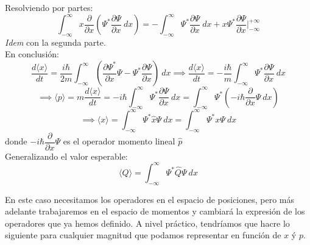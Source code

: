 \documentclass{report}
\begin{document}
    \noindent Resolviendo por partes:\\ 
    \[\int_{-\infty}^{\infty}x\dfrac{\partial}{\partial x}\left(\Psi^*\dfrac{\partial\Psi}{\partial x}\ dx\right)=
    -\int_{-\infty}^{\infty}\Psi^*\dfrac{\partial\Psi}{\partial x}\ dx+x\Psi^*\dfrac{\partial\Psi}{\partial x}\Big|_{-\infty}^{+\infty}\]
    \noindent \textit{Idem} con la segunda parte.\\

\clearpage
    \noindent En conclusión:
    \begin{equation}
      \dfrac{d\langle x\rangle}{dt}=\dfrac{i\hbar}{2m}\int_{-\infty}^{\infty}\left(\dfrac{\partial\Psi^*}{\partial x}\Psi-\Psi^*\dfrac{\partial\Psi}{\partial x}\right)\ dx \implies
      \boxed{\dfrac{d\langle x\rangle}{dt}=-\dfrac{i\hbar}{m}\int_{-\infty}^{\infty}\Psi^*\dfrac{\partial\Psi}{\partial x}\ dx}
    \end{equation}
    \[\implies \langle p\rangle=m\dfrac{d\langle x\rangle}{dt}=-i\hbar\int_{-\infty}^{\infty}\Psi^*\dfrac{\partial\Psi}{\partial x}\ dx=
    \int_{-\infty}^{\infty}\Psi^*\left(-i\hbar\dfrac{\partial}{\partial x}\Psi\ dx\right)\] 
    \[\implies \langle x\rangle=\int_{-\infty}^{\infty}\Psi^*\hat{x}\Psi\ dx=\int_{-\infty}^{\infty}\Psi^* x\Psi\ dx\]
    donde $-i\hbar\dfrac{\partial}{\partial x}\Psi$ es el operador momento lineal $\hat{p}$\\
    

    \noindent Generalizando el valor esperable:
    \begin{equation}
      \langle Q \rangle =\int_{-\infty}^{\infty}\Psi^*\hat{Q}\Psi\ dx
    \end{equation}

    \noindent En este caso necesitamos los operadores en el espacio de posiciones, 
    pero más adelante trabajaremos en el espacio de momentos y 
    cambiará la expresión de los operadores que ya hemos definido. A nivel práctico,
    tendríamos que hacre lo siguiente para cualquier magnitud que podamos 
    representar en función de $x$ ý $p$.\\

\end{document}
